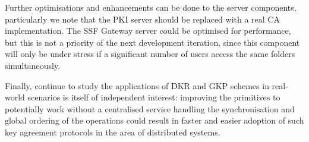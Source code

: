 Further optimisations and enhancements can be done
to the server components, particularly we note that
the PKI server should be replaced with a real CA
implementation. The SSF Gateway server could be optimised
for performance, but this is not a priority of the
next development iteration, since this component will only be
under stress if a significant number of users
access the same folders simultaneously.

Finally, continue to study the applications of DKR and GKP schemes in
real-world scenarios is itself of independent interest: 
improving the primitives to potentially work without a 
centralised service handling the synchronisation and global ordering 
of the operations could result in faster and easier adoption of such 
key agreement protocols in the area of distributed systems.

